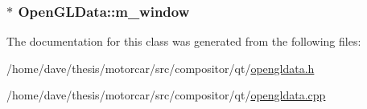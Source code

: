 \hypertarget{classOpenGLData_ad4867a83945326a3523a1aa54bc1f016}{
\subsubsection[{m\-\_\-window}]{$\ast$ Open\-G\-L\-Data\-::m\-\_\-window}}\label{classOpenGLData_ad4867a83945326a3523a1aa54bc1f016}


The documentation for this class was generated from the following files\-:\begin{DoxyCompactItemize}
\item 
/home/dave/thesis/motorcar/src/compositor/qt/\hyperlink{opengldata_8h}{opengldata.\-h}\item 
/home/dave/thesis/motorcar/src/compositor/qt/\hyperlink{opengldata_8cpp}{opengldata.\-cpp}\end{DoxyCompactItemize}
